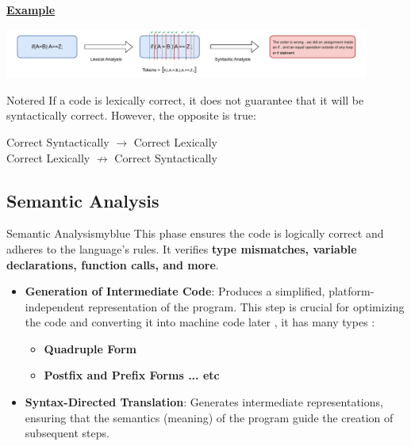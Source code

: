\vspace{0.95cm}
\underline{\textbf{Example}}

\vspace{0.35cm}
\begin{center}
    \includegraphics[height=0.14\textheight,width=0.9\textwidth]{Chapters/Examples/Intro/ex3.drawio.pdf}
\end{center}

\vspace{0.5cm}

\begin{prettyBox}{Note}{red}
If a code is lexically correct, it does not guarantee that it will be syntactically correct. However, the opposite is true:

\begin{center}
    Correct Syntactically $\rightarrow$ Correct Lexically \\[0.15cm]
    Correct Lexically $\nrightarrow$ Correct Syntactically
\end{center}

\end{prettyBox}

\vspace{0.35cm}

\subsection{Semantic Analysis}
\begin{prettyBox}{Semantic Analysis}{myblue}
This phase ensures the code is logically correct and adheres to the language's rules. It verifies \textbf{type mismatches, variable declarations, function calls, and more}.

\begin{itemize}
    \item \textbf{Generation of Intermediate Code}: 
    Produces a simplified, platform-independent representation of the program. This step is crucial for optimizing the code and converting it into machine code later , it has many types :
    \begin{itemize}
        \item \textbf{Quadruple Form}
        \item \textbf{Postfix and Prefix Forms ... etc}
    \end{itemize}

    \item \textbf{Syntax-Directed Translation}: 
    Generates intermediate representations, ensuring that the semantics (meaning) of the program guide the creation of subsequent steps.
\end{itemize}
\end{prettyBox}

